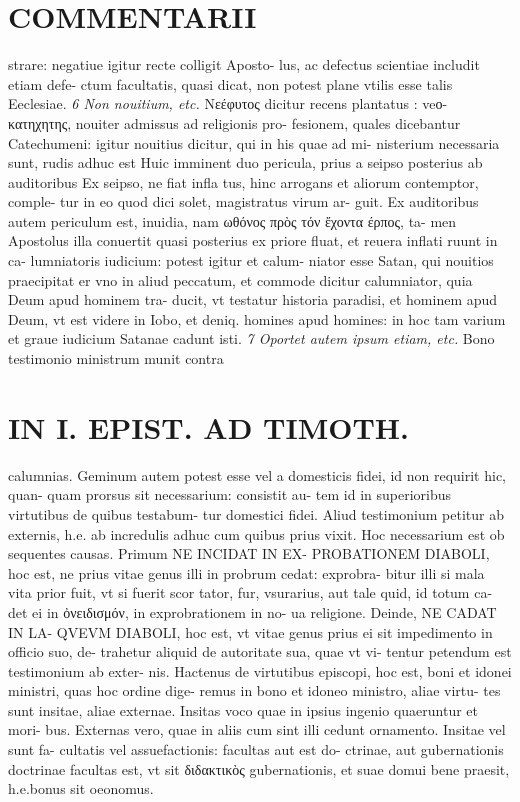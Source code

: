 \documentclass{article}
\begin{document}
\begin{pages}
\section*{COMMENTARII }
\marginpar{[ p.68 ]}\pstart strare: negatiue igitur recte colligit Aposto- lus, ac defectus scientiae includit etiam defe- ctum facultatis, quasi dicat, non potest plane vtilis esse talis Eeclesiae.  \pend
\textit{6 Non nouitium, etc. }\pstart Νεέφυτος dicitur recens plantatus : veο- κατηχητης, nouiter admissus ad religionis pro- fesionem, quales dicebantur Catechumeni: igitur nouitius dicitur, qui in his quae ad mi- nisterium necessaria sunt, rudis adhuc est Huic imminent duo pericula, prius a seipso posterius ab auditoribus  Ex seipso, ne fiat infla tus, hinc arrogans et aliorum contemptor, comple- tur in eo quod dici solet, magistratus virum ar- guit. Ex auditoribus autem periculum est, inuidia, nam ωθόνος πρὸς τόν ἔχοντα έρπος, ta- men Apostolus illa conuertit quasi posterius ex priore fluat, et reuera inflati ruunt in ca- lumniatoris iudicium: potest igitur et calum- niator esse Satan, qui nouitios praecipitat er vno in aliud peccatum, et commode dicitur calumniator, quia Deum apud hominem tra- ducit, vt testatur historia paradisi, et hominem apud Deum, vt est videre in Iobo, et deniq. homines apud homines: in hoc tam varium et graue iudicium Satanae cadunt isti.  \pend
\textit{7 Oportet autem ipsum etiam, etc. }\pstart Bono testimonio ministrum munit contra  \pend
\section*{IN I. EPIST. AD TIMOTH. }
\marginpar{[ p.69 ]}\pstart calumnias. Geminum autem potest esse vel a domesticis fidei, id non requirit hic, quan- quam prorsus sit necessarium: consistit au- tem id in superioribus  virtutibus  de quibus  testabum- tur domestici fidei. Aliud testimonium petitur ab externis, h.e. ab incredulis adhuc cum quibus  prius vixit. Hoc necessarium est ob sequentes causas. Primum NE INCIDAT IN EX- PROBATIONEM DIABOLI, hoc est, ne prius vitae genus illi in probrum cedat: exprobra- bitur illi si mala vita prior fuit, vt si fuerit scor tator, fur, vsurarius, aut tale quid, id totum ca- det ei in ὀνειδισμόν, in exprobrationem in no- ua religione. Deinde, NE CADAT IN LA- QVEVM DIABOLI, hoc est, vt vitae genus prius ei sit impedimento in officio suo, de- trahetur aliquid de autoritate sua, quae vt vi- tentur petendum est testimonium ab exter- nis. Hactenus de virtutibus episcopi, hoc est, boni et idonei ministri, quas hoc ordine dige- remus in bono et idoneo ministro, aliae virtu- tes sunt insitae, aliae externae. Insitas voco quae in ipsius ingenio quaeruntur et mori- bus. Externas vero, quae in aliis cum sint illi cedunt ornamento. Insitae vel sunt fa- cultatis vel assuefactionis: facultas aut est do- ctrinae, aut gubernationis doctrinae facultas est, vt sit διδακτικὸς gubernationis, et suae domui bene praesit, h.e.bonus sit oeonomus.  \pend

\end{pages}
\end{document}

